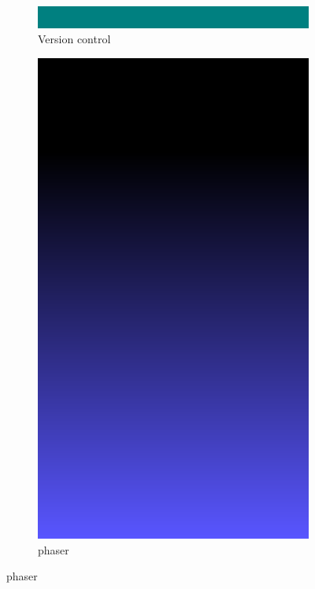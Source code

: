 \documentclass{article}
\begin{document}
\begin{figure}[ht]
\centering
\begin{subfigure}{.5\textwidth}
  \centering
  \includegraphics[width=.3\linewidth]{platform}
  \caption{Version control}
  \label{fig:sub1}
\end{subfigure}%
\begin{subfigure}{.5\textwidth}
  \centering
  \includegraphics[width=.3\linewidth]{sky}
  \caption{phaser}
  \label{fig:sub2}
\end{subfigure}
\end{figure}
\end{document}
